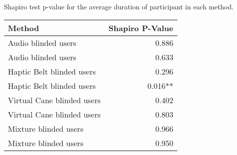 
\centering
\caption{Shapiro test p-value for the average duration of participant in each method.}
\label{tab:shapiro_duration_avg}
\begin{tabular}{lr}
\toprule
                    Method & Shapiro P-Value \\
\midrule
       Audio blinded users &           0.886 \\
       Audio blinded users &           0.633 \\
 Haptic Belt blinded users &           0.296 \\
 Haptic Belt blinded users &         0.016** \\
Virtual Cane blinded users &           0.402 \\
Virtual Cane blinded users &           0.803 \\
     Mixture blinded users &           0.966 \\
     Mixture blinded users &           0.950 \\
\bottomrule
\end{tabular}
